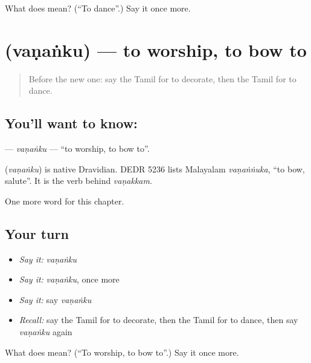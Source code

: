 \begin{tcolorbox}[breakable,colback=teal!4,colframe=teal!35!black,title={Before you move on}]
What does  mean? (\textquotedblleft{}To dance\textquotedblright{}.) Say it once more.
\end{tcolorbox}
\section[\texorpdfstring{\ta{வணங்கு} (vaṇaṅku)}{வணங்கு (vaṇaṅku)}]{ (vaṇaṅku) — to worship, to bow to}

\label{lesson:TA-C165-vananku}



\begin{quote}
Before the new one: say the Tamil for to decorate, then the Tamil for to dance.
\end{quote}

\subsection*{You'll want to know: }
\textbf{} — \emph{vaṇaṅku} — \textquotedblleft{}to worship, to bow to\textquotedblright{}.

\begin{cousinweb}
\textbf{} (\emph{vaṇaṅku}) is native Dravidian. DEDR 5236 lists Malayalam \emph{vaṇaṅṅuka}, \textquotedblleft{}to bow, salute\textquotedblright{}. It is the verb behind \emph{vaṇakkam}.
\end{cousinweb}

\begin{grammarlens}[title={What you've built}]
One more word for this chapter.
\end{grammarlens}

\subsection*{Your turn}
\begin{itemize}
\raggedright
  \item \emph{Say it:} \emph{vaṇaṅku}
  \item \emph{Say it:} \emph{vaṇaṅku}, once more
  \item \emph{Say it:} say \emph{vaṇaṅku}
  \item \emph{Recall:} say the Tamil for to decorate, then the Tamil for to dance, then say \emph{vaṇaṅku} again
\end{itemize}

\begin{tcolorbox}[breakable,colback=teal!4,colframe=teal!35!black,title={Before you move on}]
What does  mean? (\textquotedblleft{}To worship, to bow to\textquotedblright{}.) Say it once more.
\end{tcolorbox}
